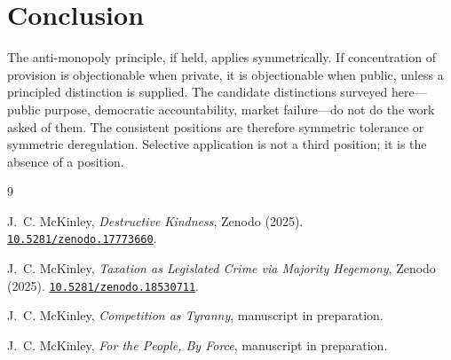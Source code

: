 \documentclass[11pt]{article}
\begin{document}
\section{Conclusion}

The anti-monopoly principle, if held, applies symmetrically. If concentration of provision is objectionable when private, it is objectionable when public, unless a principled distinction is supplied. The candidate distinctions surveyed here---public purpose, democratic accountability, market failure---do not do the work asked of them. The consistent positions are therefore symmetric tolerance or symmetric deregulation. Selective application is not a third position; it is the absence of a position.

\begin{thebibliography}{9}

J.~C. McKinley, \emph{Destructive Kindness}, Zenodo (2025). \href{https://doi.org/10.5281/zenodo.17773660}{\texttt{10.5281/zenodo.17773660}}.

J.~C. McKinley, \emph{Taxation as Legislated Crime via Majority Hegemony}, Zenodo (2025). \href{https://doi.org/10.5281/zenodo.18530711}{\texttt{10.5281/zenodo.18530711}}.

J.~C. McKinley, \emph{Competition as Tyranny}, manuscript in preparation.

J.~C. McKinley, \emph{For the People, By Force}, manuscript in preparation.

\end{thebibliography}
\end{document}
